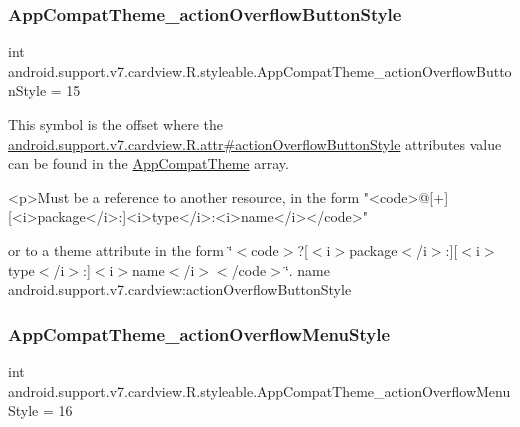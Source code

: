 \subsubsection{\texorpdfstring{App\+Compat\+Theme\+\_\+action\+Overflow\+Button\+Style}{AppCompatTheme\_actionOverflowButtonStyle}}
{\footnotesize\ttfamily int android.\+support.\+v7.\+cardview.\+R.\+styleable.\+App\+Compat\+Theme\+\_\+action\+Overflow\+Button\+Style = 15\hspace{0.3cm}{\ttfamily [static]}}

This symbol is the offset where the \hyperlink{classandroid_1_1support_1_1v7_1_1cardview_1_1R_1_1attr_abfea2f33047e08b00173057b1ee9045d}{android.\+support.\+v7.\+cardview.\+R.\+attr\#action\+Overflow\+Button\+Style} attribute\textquotesingle{}s value can be found in the \hyperlink{classandroid_1_1support_1_1v7_1_1cardview_1_1R_1_1styleable_a52e6f69f954ecc2622d72c0b4d298938}{App\+Compat\+Theme} array.

\begin{DoxyVerb}      <p>Must be a reference to another resource, in the form "<code>@[+][<i>package</i>:]<i>type</i>:<i>name</i></code>"
\end{DoxyVerb}
 or to a theme attribute in the form \char`\"{}$<$code$>$?\mbox{[}$<$i$>$package$<$/i$>$\+:\mbox{]}\mbox{[}$<$i$>$type$<$/i$>$\+:\mbox{]}$<$i$>$name$<$/i$>$$<$/code$>$\char`\"{}.  name android.\+support.\+v7.\+cardview\+:action\+Overflow\+Button\+Style \mbox{\label{classandroid_1_1support_1_1v7_1_1cardview_1_1R_1_1styleable_af2526f4e27bf70cfd50bef8645b28ceb}} 
\subsubsection{\texorpdfstring{App\+Compat\+Theme\+\_\+action\+Overflow\+Menu\+Style}{AppCompatTheme\_actionOverflowMenuStyle}}
{\footnotesize\ttfamily int android.\+support.\+v7.\+cardview.\+R.\+styleable.\+App\+Compat\+Theme\+\_\+action\+Overflow\+Menu\+Style = 16\hspace{0.3cm}{\ttfamily [static]}}

